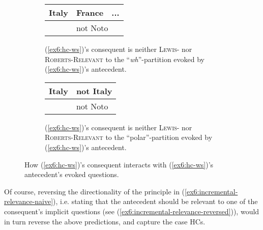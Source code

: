 \begin{figure}[H]
	\centering
	\begin{subfigure}[t]{.47\linewidth}
		\centering
			\begin{tabular}{llll|}
				\hline
				\multicolumn{2}{|l|}{Italy} & \multicolumn{1}{l|}{France} & ... \\ \hline
				\multicolumn{1}{l|}{}   & \multicolumn{3}{l|}{\cellcolor{orange!20!white}not Noto}         \\ \cline{2-4} 
			\end{tabular}
		\caption{(\ref{ex6:hc-ws})'s consequent is neither \textsc{Lewis-} nor \textsc{Roberts-Relevant} to the ``\textit{wh}''-partition evoked by (\ref{ex6:hc-ws})'s antecedent.}\label{tab:italy-not-noto-wh-rel}
	\end{subfigure}
	\hfill
	\begin{subfigure}[t]{.47\linewidth}
		\centering
		\begin{tabular}{llll|}
			\hline
			\multicolumn{2}{|l|}{Italy} & \multicolumn{2}{l|}{not Italy} \\ \hline
			\multicolumn{1}{l|}{}   & \multicolumn{3}{l|}{\cellcolor{orange!20!white}not Noto}      \\ \cline{2-4} 
		\end{tabular}
		\caption{(\ref{ex6:hc-ws})'s consequent is neither \textsc{Lewis-} nor \textsc{Roberts-Relevant} to the ``polar''-partition evoked by (\ref{ex6:hc-ws})'s antecedent.}\label{tab:italy-not-noto-polar-rel}
	\end{subfigure}
	\caption{How (\ref{ex6:hc-ws})'s consequent interacts with (\ref{ex6:hc-ws})'s antecedent's evoked questions.}
\end{figure}

Of course, reversing the directionality of the principle in (\ref{ex6:incremental-relevance-naive}), i.e. stating that the antecedent should be relevant to one of the consequent's implicit questions (see (\ref{ex6:incremental-relevance-reversed})), would in turn reverse the above predictions, and capture the case HCs. 


\begin{exe}
	\label{ex6:incremental-relevance-reversed}
\end{exe}

